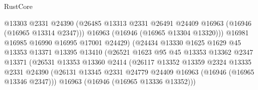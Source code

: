 \begin{lexlean}{RustCore}
\begin{coremodule}
                                      @13303
                                      @2331
                                      @24390
                                      (@26485
                                        @13313
                                        @2331
                                        @26491
                                        @24409
                                        @16963
                                        (@16946 (@16965 @13314 @2347)))
                                      @16963
                                      (@16946 (@16965 @13304 @13320)))
                                    @16981
                                    @16985
                                    @16990
                                    @16995
                                    @17001
                                    @24429)
                                  (@24434
                                    @13330
                                    @1625
                                    @1629
                                    @45
                                    @13353
                                    @13371
                                    @13395
                                    @13410
                                    (@26521
                                      @1623
                                      @95
                                      @45
                                      @13353
                                      @13362
                                      @2347
                                      @13371
                                      (@26531
                                        @13353
                                        @13360
                                        @2414
                                        (@26117
                                          @13352
                                          @13359
                                          @2324
                                          @13335
                                          @2331
                                          @24390
                                          (@26131
                                            @13345
                                            @2331
                                            @24779
                                            @24409
                                            @16963
                                            (@16946 (@16965 @13346 @2347)))
                                          @16963
                                          (@16946 (@16965 @13336 @13352)))

\end{coremodule}
\end{lexlean}

